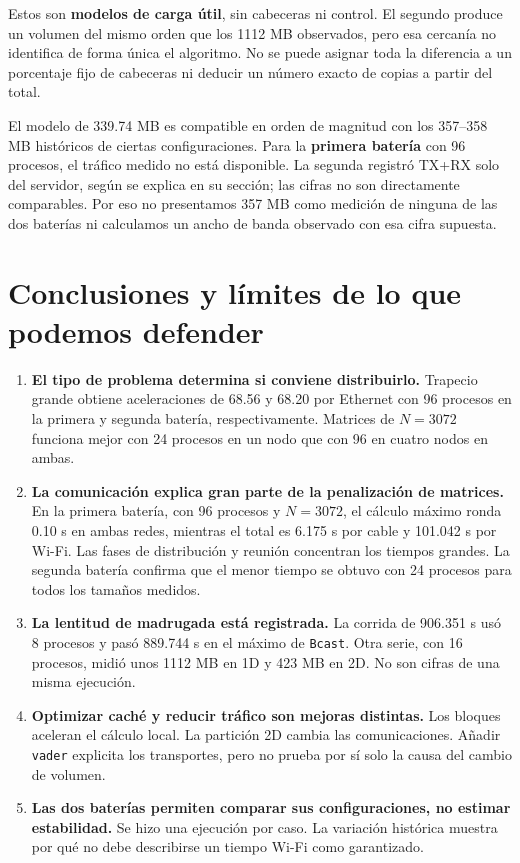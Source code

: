 Estos son \textbf{modelos de carga útil}, sin cabeceras ni control. El segundo produce un volumen del mismo orden que los 1112 MB observados, pero esa cercanía no identifica de forma única el algoritmo. No se puede asignar toda la diferencia a un porcentaje fijo de cabeceras ni deducir un número exacto de copias a partir del total.

El modelo de 339.74 MB es compatible en orden de magnitud con los 357--358 MB históricos de ciertas configuraciones. Para la \textbf{primera batería} con 96 procesos, el tráfico medido no está disponible. La segunda registró TX+RX solo del servidor, según se explica en su sección; las cifras no son directamente comparables. Por eso no presentamos 357 MB como medición de ninguna de las dos baterías ni calculamos un ancho de banda observado con esa cifra supuesta.

\clearpage
\section{Conclusiones y límites de lo que podemos defender}

\begin{enumerate}
\item \textbf{El tipo de problema determina si conviene distribuirlo.} Trapecio grande obtiene aceleraciones de 68.56 y 68.20 por Ethernet con 96 procesos en la primera y segunda batería, respectivamente. Matrices de $N=3072$ funciona mejor con 24 procesos en un nodo que con 96 en cuatro nodos en ambas.
\item \textbf{La comunicación explica gran parte de la penalización de matrices.} En la primera batería, con 96 procesos y $N=3072$, el cálculo máximo ronda 0.10 s en ambas redes, mientras el total es 6.175 s por cable y 101.042 s por Wi-Fi. Las fases de distribución y reunión concentran los tiempos grandes. La segunda batería confirma que el menor tiempo se obtuvo con 24 procesos para todos los tamaños medidos.
\item \textbf{La lentitud de madrugada está registrada.} La corrida de 906.351 s usó 8 procesos y pasó 889.744 s en el máximo de \texttt{Bcast}. Otra serie, con 16 procesos, midió unos 1112 MB en 1D y 423 MB en 2D. No son cifras de una misma ejecución.
\item \textbf{Optimizar caché y reducir tráfico son mejoras distintas.} Los bloques aceleran el cálculo local. La partición 2D cambia las comunicaciones. Añadir \texttt{vader} explicita los transportes, pero no prueba por sí solo la causa del cambio de volumen.
\item \textbf{Las dos baterías permiten comparar sus configuraciones, no estimar estabilidad.} Se hizo una ejecución por caso. La variación histórica muestra por qué no debe describirse un tiempo Wi-Fi como garantizado.
\end{enumerate}

